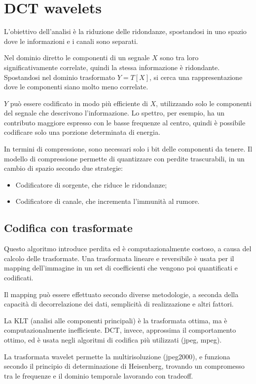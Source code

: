 \section{DCT wavelets}
L'obiettivo dell'analisi è la riduzione delle ridondanze, spostandosi in uno spazio dove le informazioni e i canali sono separati. 

Nel dominio diretto le componenti di un segnale $X$ sono tra loro significativamente correlate, quindi la stessa informazione è ridondante. Spostandosi nel dominio trasformato $Y = T[X]$, si cerca una rappresentazione dove le componenti siano molto meno correlate.

$Y$ può essere codificato in modo più efficiente di $X$, utilizzando solo le componenti del segnale che descrivono l'informazione. Lo spettro, per esempio, ha un contributo maggiore espresso con le basse frequenze al centro, quindi è possibile codificare solo una porzione determinata di energia.

In termini di compressione, sono necessari solo i bit delle componenti da tenere. Il modello di compressione permette di quantizzare con perdite trascurabili, in un cambio di spazio secondo due strategie:
\begin{itemize}
	\item Codificatore di sorgente, che riduce le ridondanze;
	\item Codificatore di canale, che incrementa l'immunità al rumore.
\end{itemize}

\subsection{Codifica con trasformate}
Questo algoritmo introduce perdita ed è computazionalmente costoso, a causa del calcolo delle trasformate. Una trasformata lineare e reversibile è usata per il mapping dell'immagine in un set di coefficienti che vengono poi quantificati e codificati.

Il mapping può essere effettuato secondo diverse metodologie, a seconda della capacità di decorrelazione dei dati, semplicità di realizzazione e altri fattori.

La KLT (analisi alle componenti principali) è la trasformata ottima, ma è computazionalmente inefficiente. DCT, invece, approssima il comportamento ottimo, ed è usata negli algoritmi di codifica più utilizzati (jpeg, mpeg).

La trasformata wavelet permette la multirisoluzione (jpeg2000), e funziona secondo il principio di determinazione di Heisenberg, trovando un compromesso tra le frequenze e il dominio temporale lavorando con tradeoff.

